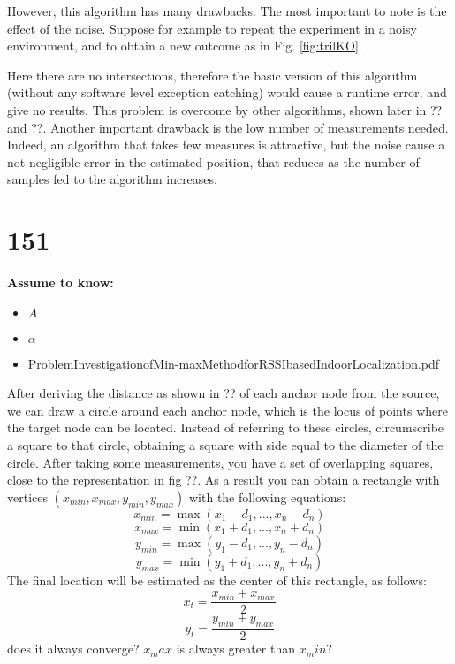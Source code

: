 \documentclass[12pt]{report}
\begin{document}
However, this algorithm has many drawbacks. The most important to note is the effect of the noise. Suppose for example to repeat the experiment in a noisy environment, and to obtain a new outcome as in Fig. \ref{fig:trilKO}.

Here there are no intersections, therefore the basic version of this algorithm (without any software level exception catching) would cause a runtime error, and give no results. This problem is overcome by other algorithms, shown later in ?? and ??. Another important drawback is the low number of measurements needed. Indeed, an algorithm that takes few measures is attractive, but the noise cause a not negligible error in the estimated position, that reduces as the number of samples fed to the algorithm increases.
\clearpage

\section{151}
  \begin{center}
  \textbf{Assume to know:}
  \begin{itemize}
    \centering
    \item $A$
    \item $\alpha$
  \end{itemize}
  \end{center}
  \begin{itemize}
      \item ProblemInvestigationofMin-maxMethodforRSSIbasedIndoorLocalization.pdf
  \end{itemize}
After deriving the distance as shown in ?? of each anchor node from the source, we can draw a circle around each anchor node, which is the locus of points where the target node can be located. Instead of referring to these circles, circumscribe a square to that circle, obtaining a square with side equal to the diameter of the circle. After taking some measurements, you have a set of overlapping squares, close to the representation in fig ??. As a result you can obtain a rectangle with vertices $(x_{min},x_{max},y_{min},y_{max})$ with the following equations:
\begin{equation}
    x_{min}=\max(x_1-d_1,...,x_n-d_n)
\end{equation}
\begin{equation}
    x_{max}=\min(x_1+d_1,...,x_n+d_n)
\end{equation}
\begin{equation}
    y_{min}=\max(y_1-d_1,...,y_n-d_n)
\end{equation}
\begin{equation}
    y_{max}=\min(y_1+d_1,...,y_n+d_n)
\end{equation}
The final location will be estimated as the center of this rectangle, as follows:
\begin{equation}
    x_t=\frac{x_{min}+x_{max}}{2}
\end{equation}
\begin{equation}
    y_t=\frac{y_{min}+y_{max}}{2}
\end{equation}
does it always converge? $x_max$ is always greater than $x_min$?
\clearpage
\end{document}
